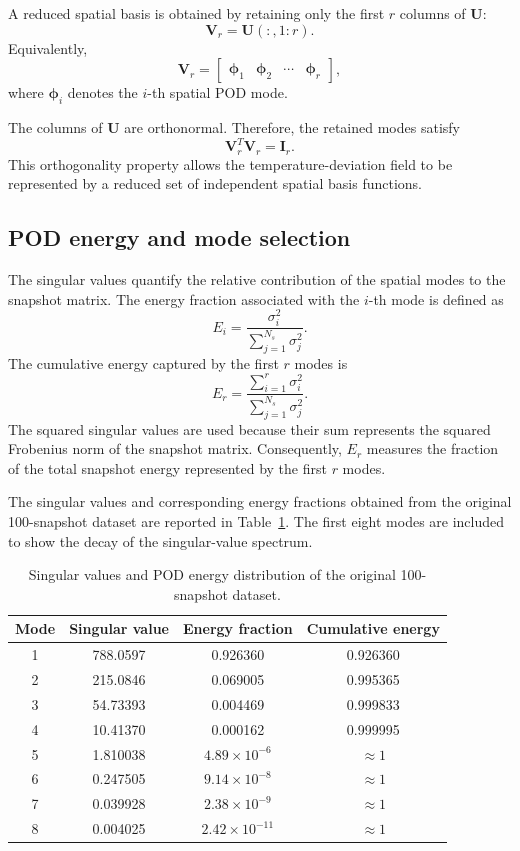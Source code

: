 A reduced spatial basis is obtained by retaining only the first
$r$ columns of $\mathbf{U}$:
\[
\boxed{
\mathbf{V}_r=\mathbf{U}(:,1:r).
}
\]
Equivalently,
\[
\mathbf{V}_r
=
\begin{bmatrix}
\boldsymbol{\phi}_1 &
\boldsymbol{\phi}_2 &
\cdots &
\boldsymbol{\phi}_r
\end{bmatrix},
\]
where $\boldsymbol{\phi}_i$ denotes the $i$-th spatial POD
mode.

The columns of $\mathbf{U}$ are orthonormal. Therefore, the
retained modes satisfy
\[
\boxed{
\mathbf{V}_r^T\mathbf{V}_r=\mathbf{I}_r.
}
\]
This orthogonality property allows the temperature-deviation
field to be represented by a reduced set of independent
spatial basis functions.

\subsection{POD energy and mode selection}

The singular values quantify the relative contribution of the
spatial modes to the snapshot matrix. The energy fraction
associated with the $i$-th mode is defined as
\[
\boxed{
E_i=
\frac{\sigma_i^2}
{\displaystyle\sum_{j=1}^{N_s}\sigma_j^2}.
}
\]
The cumulative energy captured by the first $r$ modes is
\[
\boxed{
E_r=
\frac{\displaystyle\sum_{i=1}^{r}\sigma_i^2}
{\displaystyle\sum_{j=1}^{N_s}\sigma_j^2}.
}
\]
The squared singular values are used because their sum
represents the squared Frobenius norm of the snapshot matrix.
Consequently, $E_r$ measures the fraction of the total
snapshot energy represented by the first $r$ modes.

The singular values and corresponding energy fractions
obtained from the original 100-snapshot dataset are reported
in Table~\ref{tab:pod_energy}. The first eight modes are
included to show the decay of the singular-value spectrum.

\begin{table}[htbp]
    \centering
    \caption{Singular values and POD energy distribution
    of the original 100-snapshot dataset.}
    \label{tab:pod_energy}
    \begin{tabular}{cccc}
        \toprule
        \textbf{Mode} &
        \textbf{Singular value} &
        \textbf{Energy fraction} &
        \textbf{Cumulative energy} \\
        \midrule
        1 & 788.0597 & 0.926360 & 0.926360 \\
        2 & 215.0846 & 0.069005 & 0.995365 \\
        3 & 54.73393 & 0.004469 & 0.999833 \\
        4 & 10.41370 & 0.000162 & 0.999995 \\
        5 & 1.810038 & $4.89\times10^{-6}$ & $\approx 1$ \\
        6 & 0.247505 & $9.14\times10^{-8}$ & $\approx 1$ \\
        7 & 0.039928 & $2.38\times10^{-9}$ & $\approx 1$ \\
        8 & 0.004025 & $2.42\times10^{-11}$ & $\approx 1$ \\
        \bottomrule
    \end{tabular}
\end{table}

